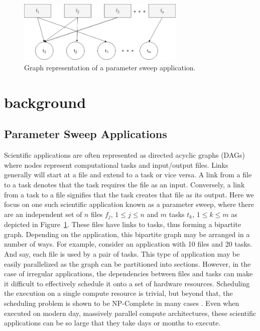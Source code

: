 \begin{figure}[H]
  \centering
  \includegraphics[width=80mm, height=30mm]{figures/dag.png}
  \caption{Graph representation of a parameter sweep application.}
  \label{fig:dag}
\end{figure}

\section{background} \label{sec:background}

\subsection*{Parameter Sweep Applications}

Scientific applications are often represented as directed acyclic graphs (DAGs)
where nodes represent computational tasks and input/output files. Links
generally will start at a file and extend to a task or vice versa. A link from a
file to a task denotes that the task requires the file as an input. Conversely,
a link from a task to a file signifies that the task creates that file as its
output. Here we focus on one such scientific application known as a parameter
sweep, where there are an independent set of $n$ files $f_j$, $1 \leq j \leq n$ and $m$ tasks $t_k$, $1 \leq k \leq m$ as depicted in Figure~\ref{fig:dag}.
These files have links to tasks, thus forming a bipartite graph. Depending on the
application, this bipartite graph may be arranged in a number of ways. For
example, consider an application with 10 files and 20 tasks. And say, each file
is used by a pair of tasks. This type of application may be easily parallelized
as the graph can be partitioned into sections. However, in the case of irregular
applications, the dependencies between files and tasks can make it difficult to
effectively schedule it onto a set of hardware resources. Scheduling the
execution on a single compute resource is trivial, but beyond that, the
scheduling problem is shown to be NP-Complete in many cases
\cite{Giersch-task-sharing-files-04}. Even when executed on modern day,
massively parallel compute architectures, these scientific applications can be
so large that they take days or months to execute.

